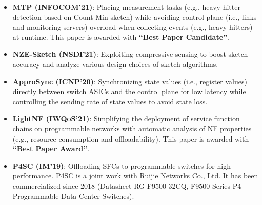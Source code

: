\documentclass{resume}
\begin{document}
\begin{itemize}
  \item \textbf{MTP (INFOCOM'21)}: Placing measurement tasks (e.g., heavy hitter detection based on Count-Min sketch) while avoiding control plane (i.e., links and monitoring servers) overload when collecting events (e.g., heavy hitters) at runtime. This paper is awarded with \textbf{``Best Paper Candidate''}. 
  \item \textbf{NZE-Sketch (NSDI'21)}: Exploiting compressive sensing to boost sketch accuracy and analyze various design choices of sketch algorithms. 
  \item \textbf{ApproSync (ICNP'20)}: Synchronizing state values (i.e., register values) directly between switch ASICs and the control plane for low latency while controlling the sending rate of state values to avoid state loss.
\end{itemize}

\begin{itemize}
  \item \textbf{LightNF (IWQoS'21)}: Simplifying the deployment of service function chains on programmable networks with automatic analysis of NF properties (e.g., resource consumption and offloadability). This paper is awarded with \textbf{``Best Paper Award''}. 
  \item \textbf{P4SC (IM'19)}: Offloading SFCs to programmable switches for high performance. P4SC is a joint work with Ruijie Networks Co., Ltd. It has been commercialized since 2018 (Datasheet RG-F9500-32CQ, F9500 Series P4 Programmable Data Center Switches).
\end{itemize}

\end{document}
